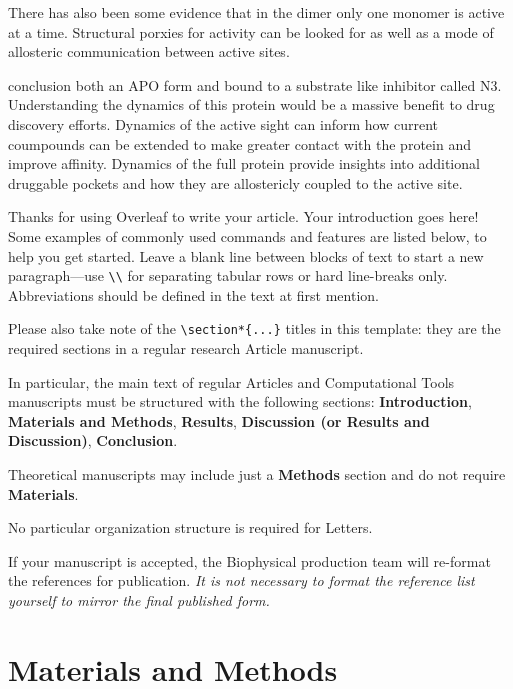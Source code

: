 \documentclass{biophys-new}
\begin{document}
There has also been some evidence that in the dimer only one monomer is active at a time. Structural porxies for activity can be looked for as well as a mode of allosteric communication between active sites.


conclusion
both an APO form and bound to a substrate like inhibitor called N3. Understanding the dynamics of this protein would be a massive benefit to drug discovery efforts. Dynamics of the active sight can inform how current coumpounds can be extended to make greater contact with the protein and improve affinity. Dynamics of the full protein provide insights into additional druggable pockets and how they are allostericly coupled to the active site.


Thanks for using Overleaf to write your article. Your introduction goes here! Some examples of commonly used commands and features are listed below, to help you get started. Leave a blank line between blocks of text to start a new paragraph---use \verb|\\| for separating tabular rows or hard line-breaks only. Abbreviations should be defined in the text at first mention.

Please also take note of the \verb|\section*{...}| titles in this template: they are the required sections in a regular research Article manuscript. 

In particular, the main text of regular Articles and Computational Tools manuscripts must be structured with the following sections: \textbf{Introduction}, \textbf{Materials and Methods}, \textbf{Results}, \textbf{Discussion (or Results and Discussion)}, \textbf{Conclusion}.

Theoretical manuscripts may include just a \textbf{Methods} section and do not require \textbf{Materials}.

No particular organization structure is required for Letters.

If your manuscript is accepted, the Biophysical production team will re-format the references for publication. \emph{It is not necessary to format the reference list yourself to mirror the final published form.}

\section*{Materials and Methods}
\end{document}
